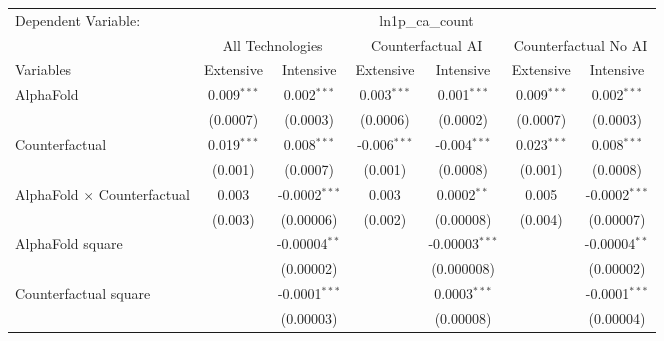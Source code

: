 \begingroup
\centering
\begin{tabular}{lcccccc}
   \tabularnewline \midrule \midrule
   Dependent Variable: & \multicolumn{6}{c}{ln1p\_ca\_count}\\
 & \multicolumn{2}{c}{All Technologies} & \multicolumn{2}{c}{Counterfactual AI} & \multicolumn{2}{c}{Counterfactual No AI} \\
\cmidrule(lr){1-1}\cmidrule(lr){2-3} \cmidrule(lr){4-5} \cmidrule(lr){6-7}
Variables & \multicolumn{1}{c}{Extensive} & \multicolumn{1}{c}{Intensive} & \multicolumn{1}{c}{Extensive} & \multicolumn{1}{c}{Intensive} & \multicolumn{1}{c}{Extensive} & \multicolumn{1}{c}{Intensive} \\
\cmidrule(lr){1-1}\cmidrule(lr){2-2} \cmidrule(lr){3-3} \cmidrule(lr){4-4} \cmidrule(lr){5-5} \cmidrule(lr){6-6} \cmidrule(lr){7-7}
   AlphaFold                          & 0.009$^{***}$ & 0.002$^{***}$      & 0.003$^{***}$  & 0.001$^{***}$     & 0.009$^{***}$ & 0.002$^{***}$\\   
                                      & (0.0007)      & (0.0003)           & (0.0006)       & (0.0002)          & (0.0007)      & (0.0003)\\   
   Counterfactual                     & 0.019$^{***}$ & 0.008$^{***}$      & -0.006$^{***}$ & -0.004$^{***}$    & 0.023$^{***}$ & 0.008$^{***}$\\   
                                      & (0.001)       & (0.0007)           & (0.001)        & (0.0008)          & (0.001)       & (0.0008)\\   
   AlphaFold $\times$ Counterfactual  & 0.003         & -0.0002$^{***}$    & 0.003          & 0.0002$^{**}$     & 0.005         & -0.0002$^{***}$\\   
                                      & (0.003)       & (0.00006)          & (0.002)        & (0.00008)         & (0.004)       & (0.00007)\\   
   AlphaFold square                   &               & -0.00004$^{**}$    &                & -0.00003$^{***}$  &               & -0.00004$^{**}$\\   
                                      &               & (0.00002)          &                & (0.000008)        &               & (0.00002)\\   
   Counterfactual square              &               & -0.0001$^{***}$    &                & 0.0003$^{***}$    &               & -0.0001$^{***}$\\   
                                      &               & (0.00003)          &                & (0.00008)         &               & (0.00004)\\   

\end{tabular}
